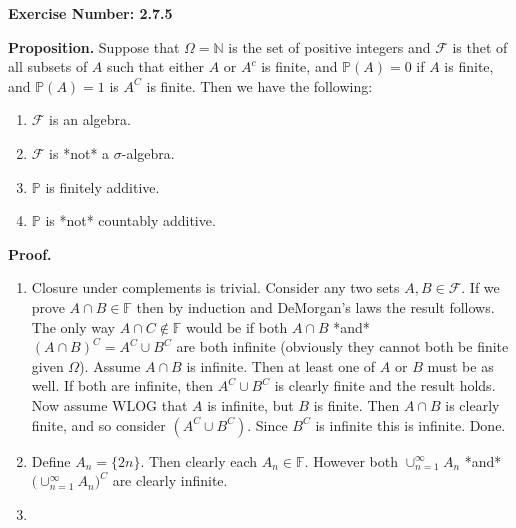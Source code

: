 \documentclass{article}
\begin{document}
\noindent \textbf{Exercise Number: 2.7.5}  %

\medskip 

\noindent \textbf{Proposition.} Suppose that $\Omega = \mathbb{N}$ is the set of positive integers 
and $\mathcal{F}$ is thet of all subsets of $A$ such that either $A$ or $A^c$ is finite, and 
$\mathbb{P}(A) = 0$ if $A$ is finite, and $\mathbb{P}(A) = 1$ is $A^C$ is finite. Then we have
the following:

\begin{enumerate}

\item $\mathcal{F}$ is an algebra. 

\item $\mathcal{F}$ is *not* a $\sigma$-algebra.

\item $\mathbb{P}$ is finitely additive. 

\item $\mathbb{P}$ is *not* countably additive. 

\end{enumerate}

\bigskip

\noindent \textbf{Proof.}  

\medskip

\begin{enumerate}

\item Closure under complements is trivial. Consider any two sets $A, B \in \mathcal{F}$. If we prove $A \cap B \in \mathbb{F}$ then by induction and DeMorgan's laws the result follows. The only way $A \cap C \notin \mathbb{F}$ would be if both $A \cap B$ *and* $(A \cap B)^C = A^C \cup B^C$ are both infinite (obviously they cannot both be finite given $\Omega$). Assume $A \cap B$ is infinite. Then at least one of $A$ or $B$ must be as well. If both are infinite, then $A^C \cup B^C$ is clearly finite and the result holds. Now assume WLOG that $A$ is infinite, but $B$ is finite. Then $A \cap B$ is clearly finite, and so consider $(A^C \cup B^C)$. Since $B^C$ is infinite this is infinite. Done. 

\item Define $A_n = \{2n\}$. Then clearly each $A_n \in \mathbb{F}$. However both $\cup_{n = 1}^{\infty} A_n$ *and* $\Big(\cup_{n = 1}^{\infty} A_n\Big)^C$ are clearly infinite. 

\item 

\end{enumerate}
\end{document}
